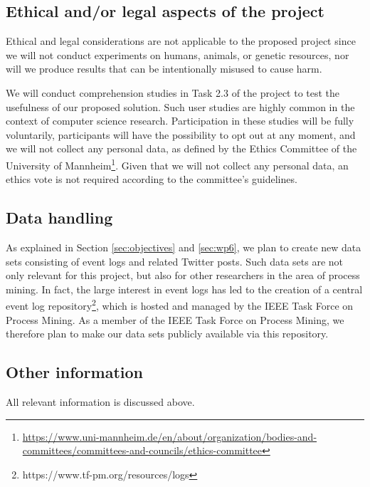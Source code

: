 
 \subsection{Ethical and/or legal aspects of the project}
 
Ethical and legal considerations are not applicable to the proposed project since we 
will not conduct experiments on humans, animals, or genetic resources, nor will we  produce results that can be intentionally misused to cause harm. 

 We will conduct comprehension studies in Task 2.3 of the project to test the usefulness of our proposed solution. Such user studies are highly common in the context of computer science research. Participation in these studies will be fully voluntarily, participants will have the possibility to opt out at any moment, and we will not collect any personal data, as defined by the Ethics Committee of the University of Mannheim\footnote{\url{https://www.uni-mannheim.de/en/about/organization/bodies-and-committees/committees-and-councils/ethics-committee}}. Given that we will not collect any personal data, an ethics vote is not required according to the committee's guidelines.


\subsection{Data handling}

 As explained in Section \ref{sec:objectives} and \ref{sec:wp6}, we plan to create new data sets consisting of event logs and related Twitter posts. Such data sets are not only relevant for this project, but also for other researchers in the area of process mining. In fact, the large interest in event logs has led to the creation of a central event log repository\footnote{https://www.tf-pm.org/resources/logs}, which is hosted and managed by the IEEE Task Force on Process Mining. As a member of the IEEE Task Force on Process Mining, we therefore plan to make our data sets publicly available via this repository. 

\subsection{Other information}

All relevant information is discussed above. 